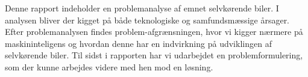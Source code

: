 Denne rapport indeholder en problemanalyse af emnet selvkørende biler. I analysen bliver der kigget på både teknologiske og samfundsmæssige årsager. Efter problemanalysen findes problem-afgrænsningen, hvor vi kigger nærmere på maskininteligens og hvordan denne har en indvirkning på udviklingen af selvkørende biler. Til sidst i rapporten har vi udarbejdet en problemformulering, som der kunne arbejdes videre med hen mod en løsning.
